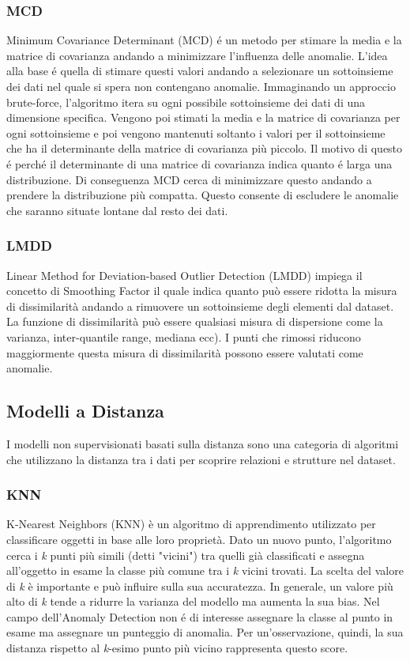 \subsubsection{MCD}
Minimum Covariance Determinant (MCD) é un metodo per stimare la media e la matrice di covarianza andando a minimizzare l'influenza delle anomalie. L'idea alla base é quella di stimare questi valori andando a selezionare un sottoinsieme dei dati nel quale si spera non contengano anomalie.
Immaginando un approccio brute-force, l'algoritmo itera su ogni possibile sottoinsieme dei dati di una dimensione specifica. Vengono poi stimati la media e la matrice di covarianza per ogni sottoinsieme e poi vengono mantenuti soltanto i valori per il sottoinsieme che ha il determinante della matrice di covarianza più piccolo. Il motivo di questo é perché il determinante di una matrice di covarianza indica quanto é larga una distribuzione. Di conseguenza MCD cerca di minimizzare questo andando a prendere la distribuzione più compatta. Questo consente di escludere le anomalie che saranno situate lontane dal resto dei dati.

\subsubsection{LMDD}
Linear Method for Deviation-based Outlier Detection (LMDD) impiega il concetto di Smoothing Factor il quale indica quanto può essere ridotta la misura di dissimilarità andando a rimuovere un sottoinsieme degli elementi dal dataset. La funzione di dissimilarità può essere qualsiasi misura di dispersione come la varianza, inter-quantile range, mediana ecc).
I punti che rimossi riducono maggiormente questa misura di dissimilarità possono essere valutati come anomalie.

\subsection{Modelli a Distanza}
I modelli non supervisionati basati sulla distanza sono una categoria di algoritmi che utilizzano la distanza tra i dati per scoprire relazioni e strutture nel dataset.

\subsubsection{KNN}
K-Nearest Neighbors (KNN) è un algoritmo di apprendimento utilizzato per classificare oggetti in base alle loro proprietà. Dato un nuovo punto, l'algoritmo cerca i \textit{k} punti più simili (detti "vicini") tra quelli già classificati e assegna all'oggetto in esame la classe più comune tra i \textit{k} vicini trovati. La scelta del valore di \textit{k} è importante e può influire sulla sua accuratezza. In generale, un valore più alto di \textit{k} tende a ridurre la varianza del modello ma aumenta la sua bias.
Nel campo dell'Anomaly Detection non é di interesse assegnare la classe al punto in esame ma assegnare un punteggio di anomalia. Per un'osservazione, quindi, la sua distanza rispetto al \textit{k}-esimo punto più vicino rappresenta questo score.

